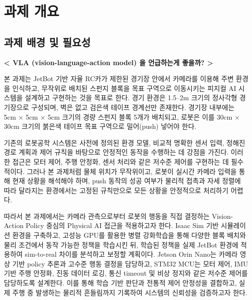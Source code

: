 \documentclass[titlepage]{pnureport}
\begin{document}
\maketitle

\tableofcontents
\clearpage
{}

\chapter{과제 개요}

\section{과제 배경 및 필요성}

\textbf{< VLA (vision-language-action model) 을 언급하는게 좋을까? >}

본 과제는 JetBot 기반 자율 RC카가 제한된 경기장 안에서 카메라를 이용해 주변 환경을 인식하고, 무작위로 배치된 스펀지 블록을 목표 구역으로 이동시키는 피지컬 AI 시스템을 설계하고 구현하는 것을 목표로 한다. 경기 환경은 1.5--2m 크기의 정사각형 경기장으로 구성되며, 벽은 없고 검은색 테이프 경계선만 존재한다. 경기장 내부에는 5cm $\times$ 5cm $\times$ 5cm 크기의 경량 스펀지 블록 5개가 배치되고, 로봇은 이를 30cm $\times$ 30cm 크기의 붉은색 테이프 목표 구역으로 밀어(push) 넣어야 한다.

기존의 로봇공학 시스템은 사전에 정의된 환경 모델, 비교적 명확한 센서 입력, 정해진 경로 계획과 제어 규칙을 바탕으로 안정적인 동작을 수행하는 데 강점을 가진다. 이러한 접근은 모터 제어, 주행 안정화, 센서 처리와 같은 저수준 제어를 구현하는 데 필수적이다. 그러나 본 과제처럼 물체 위치가 무작위이고, 로봇이 실시간 카메라 입력을 통해 현재 상황을 해석해야 하며, push 동작의 성공 여부가 물리적 접촉과 자세 정렬에 따라 달라지는 환경에서는 고정된 규칙만으로 모든 상황을 안정적으로 처리하기 어렵다.

따라서 본 과제에서는 카메라 관측으로부터 로봇의 행동을 직접 결정하는 Vision-Action Policy 중심의 Physical AI 접근을 적용하고자 한다. Isaac Sim 기반 시뮬레이션 환경을 구축하고, 고성능 GPU를 활용한 병렬 강화학습을 통해 다양한 블록 배치와 물리 조건에서 동작 가능한 정책을 학습시킨 뒤, 학습된 정책을 실제 JetBot 환경에 적용하여 sim-to-real 차이를 분석하고 보정할 계획이다. Jetson Orin Nano는 카메라 영상 기반 policy 추론과 고수준 행동 결정을 담당하고, STM32 MCU는 모터 제어, IMU 기반 주행 안정화, 진동 데이터 로깅, 통신 timeout 및 비상 정지와 같은 저수준 제어를 담당하도록 설계한다. 이를 통해 학습 기반 판단과 전통적 제어 안정성을 결합하고, 실제 주행 중 발생하는 물리적 흔들림까지 기록하여 시스템의 신뢰성을 검증하고자 한다.
\end{document}

